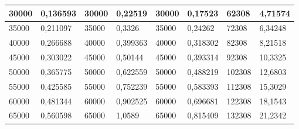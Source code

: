 \documentclass[11pt,openany]{book}
\begin{document}
\begin{table}[!ht]
\begin{tabular}{|l|l|l|l|l|l|l|l|}
        30000                                             & 0,136593                                           & 30000                                               & 0,22519                                             & 30000           & 0,17523         & 62308           & 4,71574         \\ \hline
        35000                                             & 0,211097                                           & 35000                                               & 0,3326                                              & 35000           & 0,24262         & 72308           & 6,34248         \\ \hline
        40000                                             & 0,266688                                           & 40000                                               & 0,399363                                            & 40000           & 0,318302        & 82308           & 8,21518         \\ \hline
        45000                                             & 0,303022                                           & 45000                                               & 0,50144                                             & 45000           & 0,393314        & 92308           & 10,3325         \\ \hline
        50000                                             & 0,365775                                           & 50000                                               & 0,622559                                            & 50000           & 0,488219        & 102308          & 12,6803         \\ \hline
        55000                                             & 0,425585                                           & 55000                                               & 0,752239                                            & 55000           & 0,583393        & 112308          & 15,3029         \\ \hline
        60000                                             & 0,481344                                           & 60000                                               & 0,902525                                            & 60000           & 0,696681        & 122308          & 18,1543         \\ \hline
        65000                                             & 0,560598                                           & 65000                                               & 1,0589                                              & 65000           & 0,815409        & 132308          & 21,2342         \\ \hline

\end{tabular}
\end{table}
\end{document}
